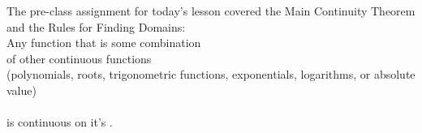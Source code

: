 \documentclass[10pt]{article}
\begin{document}
\newpage

 The pre-class assignment for today's lesson covered the Main Continuity Theorem and the Rules for Finding Domains:
%
{
%
\,\\[-0.05in]
%
Any function that is some combination \\  of other continuous functions\\
 (polynomials, \hfill roots, \hfill   trigonometric functions, \hfill exponentials, logarithms, \hfil or absolute value)
\\
  
\\
is continuous on it's .
%
}
\end{document}
